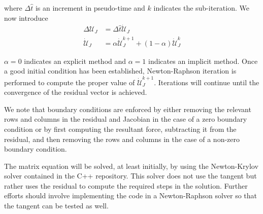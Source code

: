 where $\Delta \hat{t}$ is an increment in pseudo-time and $k$ indicates the sub-iteration. We now introduce
\begin{align*}
\Delta \mathcal{U}_J &= \Delta \hat{t} \dot{\mathcal{U}}_J\\
\dot{\mathcal{U}}_J &= \alpha \dot{\mathcal{U}}_J^{k+1} + \left(1-\alpha\right) \dot{\mathcal{U}}_J^{k}
\end{align*}

$\alpha = 0$ indicates an explicit method and $\alpha = 1$ indicates an implicit method. Once a good initial condition has been established, Newton-Raphson iteration is performed to compute the proper value of $\dot{\mathcal{U}}_J^{k+1}$. Iterations will continue until the convergence of the residual vector is achieved.

We note that boundary conditions are enforced by either removing the relevant rows and columns in the residual and Jacobian in the case of a zero boundary condition or by first computing the resultant force, subtracting it from the residual, and then removing the rows and columns in the case of a non-zero boundary condition.

The matrix equation will be solved, at least initially, by using the Newton-Krylov solver contained in the C++ repository. This solver does not use the tangent but rather uses the residual to compute the required steps in the solution. Further efforts should involve implementing the code in a Newton-Raphson solver so that the tangent can be tested as well.

\FloatBarrier

